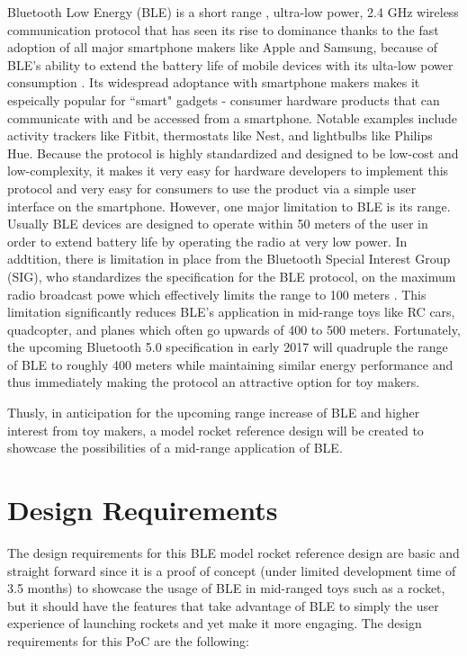 \documentclass{workreport}
\begin{document}
\begin{body}
	Bluetooth Low Energy (BLE) is a short range , ultra-low power, 2.4 GHz wireless communication protocol that has seen its rise to dominance thanks to the fast adoption of all major smartphone makers like Apple and Samsung, because of BLE's ability to extend the battery life of mobile devices with its ulta-low power consumption \cite{k_townsend_ble}. Its widespread adoptance with smartphone makers makes it espeically popular for ``smart" gadgets - consumer hardware products that can communicate with and be accessed from a smartphone. Notable examples include activity trackers like Fitbit, thermostats like Nest, and lightbulbs like Philips Hue. Because the protocol is highly standardized and designed to be low-cost and low-complexity, it makes it very easy for hardware developers to implement this protocol and very easy for consumers to use the product via a simple user interface on the smartphone. However, one major limitation to BLE is its range. Usually BLE devices are designed to operate within 50 meters of the user in order to extend battery life by operating the radio at very low power. In addtition, there is limitation in place from the Bluetooth Special Interest Group (SIG), who standardizes the specification for the BLE protocol, on the maximum radio broadcast powe which effectively limits the range to 100 meters \cite{k_townsend_ble}. This limitation significantly reduces BLE's application in mid-range toys like RC cars, quadcopter, and planes which often go upwards of 400 to 500 meters. Fortunately, the upcoming Bluetooth 5.0 specification in early 2017 will quadruple the range of BLE to roughly 400 meters while maintaining similar energy performance and thus immediately making the protocol an attractive option for toy makers.

	Thusly, in anticipation for the upcoming range increase of BLE and higher interest from toy makers, a model rocket reference design will be created to showcase the possibilities of a mid-range application of BLE.

\section{Design Requirements}

	The design requirements for this BLE model rocket reference design are basic and straight forward since it is a proof of concept (under limited development time of 3.5 months) to showcase the usage of BLE in mid-ranged toys such as a rocket, but it should have the features that take advantage of BLE to simply the user experience of launching rockets and yet make it more engaging. The design requirements for this PoC are the following:


\end{body}
\end{document}
